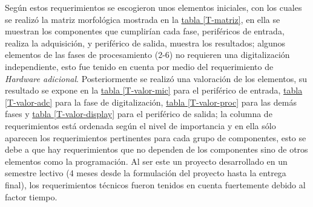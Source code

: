 \documentclass[11pt,lettersize]{article} %
\newcommand{\tabla}[1]{\hyperref[{#1}]{tabla \ref*{#1}}}
\begin{document}
Según estos requerimientos se escogieron unos elementos iniciales, con los cuales se realizó la matriz morfológica mostrada en la \tabla{T-matriz}, en ella se muestran los componentes que cumplirían cada fase, periféricos de entrada, realiza la adquisición, y periférico de salida, muestra los resultados; algunos elementos de las fases de procesamiento (2-6) no requieren una digitalización independiente, esto fue tenido en cuenta por medio del requerimiento de \emph{Hardware adicional}. Posteriormente se realizó una valoración de los elementos, su resultado se expone en la \tabla{T-valor-mic} para el periférico de entrada, \tabla{T-valor-adc} para la fase de digitalización, \tabla{T-valor-proc} para las demás fases y \tabla{T-valor-display} para el periférico de salida; la columna de requerimientos está ordenada según el nivel de importancia y en ella sólo aparecen los requerimientos pertinentes para cada grupo de componentes, esto se debe a que hay requerimientos que no dependen de los componentes sino de otros elementos como la programación. Al ser este un proyecto desarrollado en un semestre lectivo (4 meses desde la formulación del proyecto hasta la entrega final), los requerimientos técnicos fueron tenidos en cuenta fuertemente debido al factor tiempo.
\end{document}

